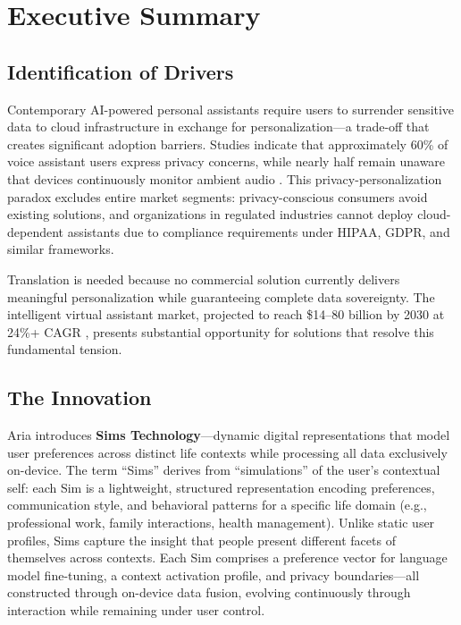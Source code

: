 \documentclass[11pt]{article}
\begin{document}
\newpage

\setcounter{page}{1}


\section{Executive Summary}
\label{sec:summary}
\vspace*{-12pt}
\subsection{Identification of Drivers}\vspace*{-8pt}

Contemporary AI-powered personal assistants require users to surrender sensitive data to cloud infrastructure in exchange for personalization---a trade-off that creates significant adoption barriers. Studies indicate that approximately 60\% of voice assistant users express privacy concerns, while nearly half remain unaware that devices continuously monitor ambient audio \cite{edu2021security, li2023security}. This privacy-personalization paradox excludes entire market segments: privacy-conscious consumers avoid existing solutions, and organizations in regulated industries cannot deploy cloud-dependent assistants due to compliance requirements under HIPAA, GDPR, and similar frameworks.

Translation is needed because no commercial solution currently delivers meaningful personalization while guaranteeing complete data sovereignty. The intelligent virtual assistant market, projected to reach \$14--80 billion by 2030 at 24\%+ CAGR \cite{grandview2023iva}, presents substantial opportunity for solutions that resolve this fundamental tension.

\vspace*{-10pt}
\subsection{The Innovation}
\vspace*{-8pt}
Aria introduces \textbf{Sims Technology}---dynamic digital representations that model user preferences across distinct life contexts while processing all data exclusively on-device. The term ``Sims'' derives from ``simulations'' of the user's contextual self: each Sim is a lightweight, structured representation encoding preferences, communication style, and behavioral patterns for a specific life domain (e.g., professional work, family interactions, health management). Unlike static user profiles, Sims capture the insight that people present different facets of themselves across contexts. Each Sim comprises a preference vector for language model fine-tuning, a context activation profile, and privacy boundaries---all constructed through on-device data fusion, evolving continuously through interaction while remaining under user control.
\end{document}
